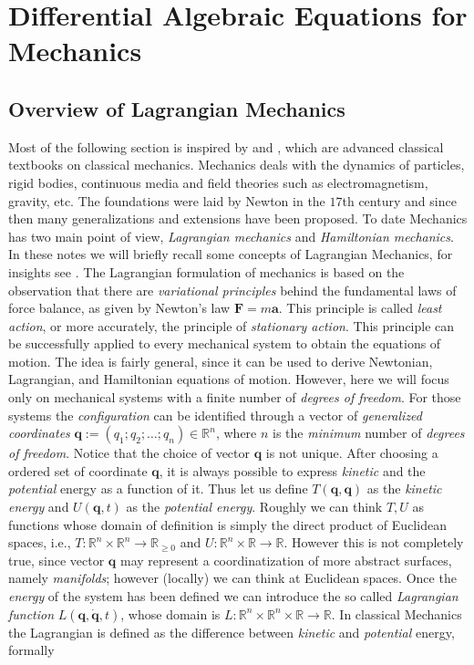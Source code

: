 %
%

\chapter{Differential Algebraic Equations for Mechanics}
	\label{ch:overview}
	\section{Overview of Lagrangian Mechanics}
		\label{sec:overview}
		Most of the following section is inspired by \cite{arnold1989mathematical} and \cite{marsden2013introduction}, which are advanced classical textbooks on classical mechanics. Mechanics deals with the dynamics of particles, rigid bodies, continuous media and field theories such as electromagnetism, gravity, etc. The foundations were laid by Newton in the $17$th century and since then many generalizations and extensions have been proposed. To date Mechanics has two main point of view, \emph{Lagrangian mechanics} and \emph{Hamiltonian mechanics}. In these notes we will briefly recall some concepts of Lagrangian Mechanics, for insights see \cite{marsden2013introduction}. The Lagrangian formulation of mechanics is based on the observation that there are \emph{variational principles} behind the fundamental laws of force balance, as given by Newton's law $\bm{F}=m\bm{a}$. This principle is called \emph{least action}, or more accurately, the principle of \emph{stationary action}. This principle can be successfully applied to every mechanical system to obtain the equations of motion. The idea is fairly general, since it can be used to derive Newtonian, Lagrangian, and Hamiltonian equations of motion. However, here we will focus only on mechanical systems with a finite number of \emph{degrees of freedom}. For those systems the \emph{configuration} can be  identified through a vector of \emph{generalized coordinates} $\bm{q} := (q_{1}; q_{2}; \dots ;q_{n})\in\mathbb{R}^{n}$, where $n$ is the \emph{minimum} number of \emph{degrees of freedom}. Notice that the choice of vector $\bm{q}$ is not unique. After choosing a ordered set of coordinate $\bm{q}$, it is always possible to express \emph{kinetic} and the \emph{potential} energy as a function of it. Thus let us define $T(\bm{q},\bm{q})$ as the \emph{kinetic energy} and $U(\bm{q},t)$ as the \emph{potential energy}. Roughly we can think $T, U$ as functions whose domain of definition is simply the direct product of Euclidean spaces, i.e., $T:\mathbb{R}^{n}\times\mathbb{R}^{n}\rightarrow\mathbb{R}_{\geq0}$ and $U:\mathbb{R}^{n}\times\mathbb{R}\rightarrow\mathbb{R}$. However this is not completely true, since vector $\bm{q}$ may represent a coordinatization of more abstract surfaces, namely \emph{manifolds}; however (locally) we can think at Euclidean spaces. Once the \emph{energy} of the system has been defined we can introduce the so called \emph{Lagrangian function} $L(\bm{q},\dot{\bm{q}},t)$, whose domain is $L:\mathbb{R}^{n}\times\mathbb{R}^{n}\times\mathbb{R}\rightarrow\mathbb{R}$. In classical Mechanics the Lagrangian is defined as the difference between \emph{kinetic} and \emph{potential} energy, formally

